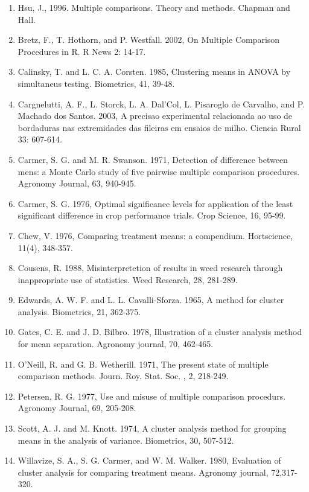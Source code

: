 \documentclass[a4paper,12pt,oneside]{book}
\providecommand{\tightlist}{%
  \setlength{\itemsep}{0pt}\setlength{\parskip}{0pt}}
\begin{document}
\begin{enumerate}
\def\labelenumi{\arabic{enumi}.}
\tightlist
\item
  Hsu, J., 1996. Multiple comparisons. Theory and methods. Chapman and Hall.
\item
  Bretz, F., T. Hothorn, and P. Westfall. 2002, On Multiple Comparison Procedures in R. R News 2: 14-17.
\item
  Calinsky, T. and L. C. A. Corsten. 1985, Clustering means in ANOVA by simultaneus testing. Biometrics, 41, 39-48.
\item
  Cargnelutti, A. F., L. Storck, L. A. Dal'Col, L. Pisaroglo de Carvalho, and P. Machado dos Santos. 2003, A precisao experimental relacionada ao uso de bordaduras nas extremidades das fileiras em ensaios de milho. Ciencia Rural 33: 607-614.
\item
  Carmer, S. G. and M. R. Swanson. 1971, Detection of difference between mens: a Monte Carlo study of five pairwise multiple comparison procedures. Agronomy Journal, 63, 940-945.
\item
  Carmer, S. G. 1976, Optimal significance levels for application of the least significant difference in crop performance trials. Crop Science, 16, 95-99.
\item
  Chew, V. 1976, Comparing treatment means: a compendium. Hortscience, 11(4), 348-357.
\item
  Cousens, R. 1988, Misinterpretetion of results in weed research through inappropriate use of statistics. Weed Research, 28, 281-289.
\item
  Edwards, A. W. F. and L. L. Cavalli-Sforza. 1965, A method for cluster analysis. Biometrics, 21, 362-375.
\item
  Gates, C. E. and J. D. Bilbro. 1978, Illustration of a cluster analysis method for mean separation. Agronomy journal, 70, 462-465.
\item
  O'Neill, R. and G. B. Wetherill. 1971, The present state of multiple comparison methods. Journ. Roy. Stat. Soc. , 2, 218-249.
\item
  Petersen, R. G. 1977, Use and misuse of multiple comparison procedurs. Agronomy Journal, 69, 205-208.
\item
  Scott, A. J. and M. Knott. 1974, A cluster analysis method for grouping means in the analysis of variance. Biometrics, 30, 507-512.
\item
  Willavize, S. A., S. G. Carmer, and W. M. Walker. 1980, Evaluation of cluster analysis for comparing treatment means. Agronomy journal, 72,317-320.
\end{enumerate}
\end{document}
